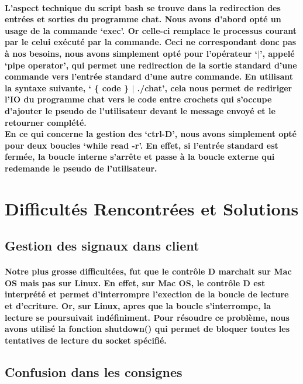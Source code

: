 \documentclass[utf8]{article}
\begin{document}
\paragraph{L'aspect technique du script bash se trouve dans la redirection des entrées et sorties du programme chat. Nous avons d'abord opté un usage de la commande `exec'. Or celle-ci remplace le processus courant
par le celui exécuté par la commande. Ceci ne correspondant donc pas à nos besoins, nous avons simplement opté pour l'opérateur `$|$', appelé `pipe operator', qui permet une redirection de la sortie standard d'une 
commande vers l'entrée standard d'une autre commande. En utilisant la syntaxe suivante, ` \{ code \} $|$ ./chat', cela nous permet de rediriger l'IO du programme chat vers le code entre crochets qui s'occupe
d'ajouter le pseudo de l'utilisateur devant le message envoyé et le retourner complété. \\
En ce qui concerne la gestion des `ctrl-D', nous avons simplement opté pour deux boucles `while read -r'. En effet, si l'entrée standard est fermée, la boucle interne s'arrête et passe à la boucle externe qui
redemande le pseudo de l'utilisateur.} %

\section{Difficultés Rencontrées et Solutions}
\subsection{Gestion des signaux dans client}
\paragraph{Notre plus grosse difficultées, fut que le contrôle D marchait sur Mac OS mais pas sur Linux. En effet, sur Mac OS, 
le contrôle D est interprété et permet d'interrompre l'exection de la boucle de lecture et d'ecriture. Or, sur Linux, apres que 
la boucle s'interrompe, la lecture se poursuivait indéfiniment. Pour résoudre ce problème, nous avons utilisé la fonction 
shutdown() qui permet de bloquer toutes les tentatives de lecture du socket spécifié.}

\subsection{Confusion dans les consignes}
\end{document}
